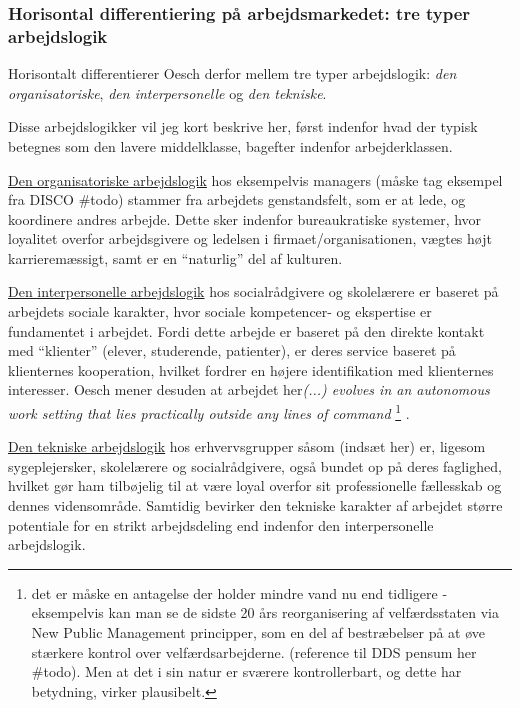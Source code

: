 
%
\subsubsection{Horisontal differentiering på arbejdsmarkedet: tre typer arbejdslogik}
%

Horisontalt differentierer Oesch derfor mellem tre typer arbejdslogik: \emph{den organisatoriske}, \emph{den interpersonelle} og \emph{den tekniske}. 

Disse arbejdslogikker vil jeg kort beskrive her, først indenfor hvad der typisk betegnes som den lavere middelklasse, bagefter indenfor arbejderklassen.

\underline{Den organisatoriske arbejdslogik} hos eksempelvis managers (måske tag eksempel fra DISCO \#todo) stammer fra arbejdets genstandsfelt, som er at lede, og koordinere andres arbejde. Dette sker indenfor bureaukratiske systemer, hvor loyalitet overfor arbejdsgivere og ledelsen i firmaet/organisationen, vægtes højt karrieremæssigt, samt er en “naturlig” del af kulturen. 

\underline{Den interpersonelle arbejdslogik} hos socialrådgivere og skolelærere er baseret på arbejdets sociale karakter, hvor sociale kompetencer- og ekspertise er fundamentet i arbejdet. Fordi dette arbejde er baseret på den direkte kontakt med “klienter” (elever, studerende, patienter), er deres service baseret på klienternes kooperation, hvilket fordrer en højere identifikation med klienternes interesser. Oesch mener desuden at arbejdet her\emph{(...) evolves in an autonomous work setting that lies practically outside any lines of command} \parencite[65]{Oesch2006a}%
%
\footnote{ det er måske en antagelse der holder mindre vand nu end tidligere  - eksempelvis kan man se de sidste 20 års reorganisering af velfærdsstaten via New Public Management principper, som en del af bestræbelser på at øve stærkere kontrol over velfærdsarbejderne. (reference til DDS pensum her \#todo). Men at det i sin natur er sværere kontrollerbart, og dette har betydning, virker plausibelt.}%
%
. 

\underline{Den tekniske arbejdslogik} hos erhvervsgrupper såsom (indsæt her) er, ligesom sygeplejersker, skolelærere og socialrådgivere, også bundet op på deres faglighed, hvilket gør ham tilbøjelig til at være loyal overfor sit professionelle fællesskab og dennes vidensområde. Samtidig bevirker den tekniske karakter af arbejdet større potentiale for en strikt arbejdsdeling end indenfor den interpersonelle arbejdslogik.

